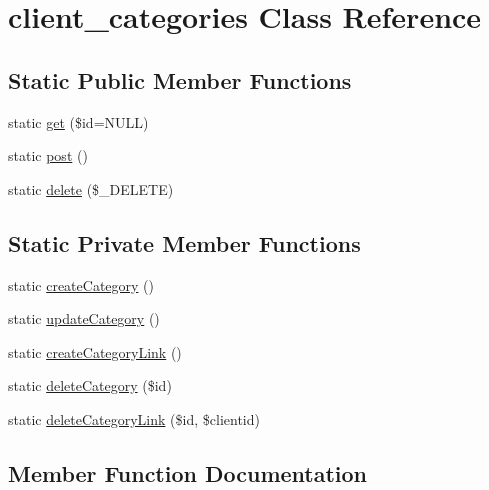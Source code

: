 \hypertarget{classclient__categories}{}\section{client\+\_\+categories Class Reference}
\label{classclient__categories}
\subsection*{Static Public Member Functions}
\begin{DoxyCompactItemize}
\item 
static \hyperlink{classclient__categories_ae04fdce0d6e979f026b6fc56bd634a40}{get} (\$id=N\+U\+L\+L)
\item 
static \hyperlink{classclient__categories_a68f2acd1041d57bf8faf2da612e202a8}{post} ()
\item 
static \hyperlink{classclient__categories_a598da63ff0199f442adaa4dfb0fe1447}{delete} (\$\+\_\+\+D\+E\+L\+E\+T\+E)
\end{DoxyCompactItemize}
\subsection*{Static Private Member Functions}
\begin{DoxyCompactItemize}
\item 
static \hyperlink{classclient__categories_a30acba254adb7feea7d8f75c373850ff}{create\+Category} ()
\item 
static \hyperlink{classclient__categories_ae21335ac166500706a659252ac5be1af}{update\+Category} ()
\item 
static \hyperlink{classclient__categories_a31253de0c3367455cb963c6e4ee6171d}{create\+Category\+Link} ()
\item 
static \hyperlink{classclient__categories_af22055a5098ca5c58d1e4f29629c049b}{delete\+Category} (\$id)
\item 
static \hyperlink{classclient__categories_aa66700a84026a52b1b29da3c788ad42a}{delete\+Category\+Link} (\$id, \$clientid)
\end{DoxyCompactItemize}


\subsection{Member Function Documentation}
\hypertarget{classclient__categories_ae04fdce0d6e979f026b6fc56bd634a40}{}
